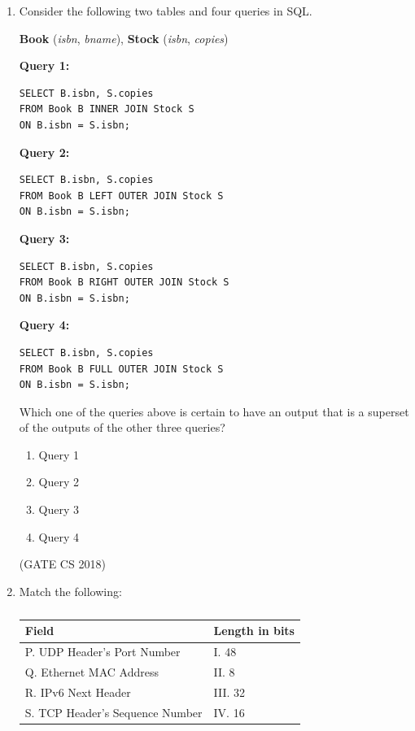 \documentclass[12pt]{article}
\begin{document}
\begin{enumerate}
\item Consider the following two tables and four queries in SQL.  

\textbf{Book} (\textit{isbn}, \textit{bname}), \quad \textbf{Stock} (\textit{isbn}, \textit{copies})

\textbf{Query 1:}
\begin{verbatim}
SELECT B.isbn, S.copies
FROM Book B INNER JOIN Stock S
ON B.isbn = S.isbn;
\end{verbatim}

\textbf{Query 2:}
\begin{verbatim}
SELECT B.isbn, S.copies
FROM Book B LEFT OUTER JOIN Stock S
ON B.isbn = S.isbn;
\end{verbatim}

\textbf{Query 3:}
\begin{verbatim}
SELECT B.isbn, S.copies
FROM Book B RIGHT OUTER JOIN Stock S
ON B.isbn = S.isbn;
\end{verbatim}

\textbf{Query 4:}
\begin{verbatim}
SELECT B.isbn, S.copies
FROM Book B FULL OUTER JOIN Stock S
ON B.isbn = S.isbn;
\end{verbatim}

Which one of the queries above is certain to have an output that is a superset of the outputs of the other three queries?

\begin{multicols}{4}
\begin{enumerate}
\item Query 1
\item Query 2
\item Query 3
\item Query 4
\end{enumerate}
\end{multicols}

(GATE CS 2018)

\item Match the following:

\begin{table}[!t]
\centering
\caption{} \label{}
\begin{tabular}{|l|l|}
\hline
\textbf{Field} & \textbf{Length in bits} \\ \hline
P. UDP Header’s Port Number & I. 48 \\ \hline
Q. Ethernet MAC Address & II. 8 \\ \hline
R. IPv6 Next Header & III. 32 \\ \hline
S. TCP Header’s Sequence Number & IV. 16 \\ \hline
\end{tabular}
\end{table}


\end{enumerate}
\end{document}
